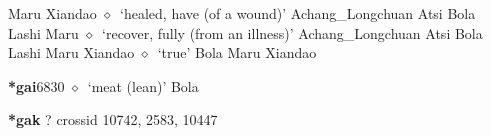 \begin{list}{}{\leftmargin=1.5em \itemindent=-1.5em}
         Maru 
\hspace{1ex}
         Xiandao 
\hspace{1ex}
         $\diamond$~`healed, have (of a wound)'
         Achang\_Longchuan 
\hspace{1ex}
         Atsi 
\hspace{1ex}
         Bola 
\hspace{1ex}
         Lashi 
\hspace{1ex}
         Maru 
\hspace{1ex}
         $\diamond$~`recover, fully (from an illness)'
         Achang\_Longchuan 
\hspace{1ex}
         Atsi 
\hspace{1ex}
         Bola 
\hspace{1ex}
         Lashi 
\hspace{1ex}
         Maru 
\hspace{1ex}
         Xiandao 
\hspace{1ex}
         $\diamond$~`true'
         Bola 
\hspace{1ex}
         Maru 
\hspace{1ex}
         Xiandao 
  \item {\footnotesize \textbf{*gai}}{\tiny 6830}
\hspace{1ex}
         $\diamond$~`meat (lean)'
         Bola 
  \end{list}
\item
\textbf{*gak}
?
  {\tiny crossid 10742, 2583, 10447}

